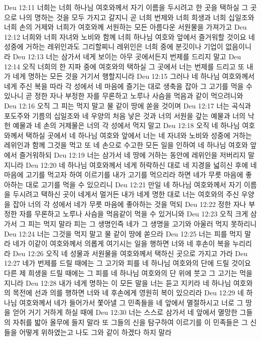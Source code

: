 Deu 12:11  너희는 너희 하나님 여호와께서 자기 이름을 두시려고 한 곳을 택하실 그 곳으로 나의 명하는 것을 모두 가지고 갈지니 곧 너희 번제와 너희 희생과 너희 십일조와 너희 손의 거제와 너희가 여호와께 서원하는 모든 아름다운 서원물을 가져가고
Deu 12:12  너희와 너희 자녀와 노비와 함께 너희 하나님 여호와 앞에서 즐거워할 것이요 네 성중에 거하는 레위인과도 그리할찌니 레위인은 너희 중에 분깃이나 기업이 없음이니라
Deu 12:13  너는 삼가서 네게 보이는 아무 곳에서든지 번제를 드리지 말고
Deu 12:14  오직 너희의 한 지파 중에 여호와의 택하실 그 곳에서 너는 번제를 드리고 또 내가 네게 명하는 모든 것을 거기서 행할지니라
Deu 12:15  그러나 네 하나님 여호와께서 네게 주신 복을 따라 각 성에서 네 마음에 즐기는 대로 생축을 잡아 그 고기를 먹을 수 있나니 곧 정한 자나 부정한 자를 무론하고 노루나 사슴을 먹음과 같이 먹으려니와
Deu 12:16  오직 그 피는 먹지 말고 물 같이 땅에 쏟을 것이며
Deu 12:17  너는 곡식과 포도주와 기름의 십일조와 네 우양의 처음 낳은 것과 너의 서원을 갚는 예물과 너의 낙헌 예물과 네 손의 거제물은 너의 각 성에서 먹지 말고
Deu 12:18  오직 네 하나님 여호와께서 택하실 곳에서 네 하나님 여호와 앞에서 너는 네 자녀와 노비와 성중에 거하는 레위인과 함께 그것을 먹고 또 네 손으로 수고한 모든 일을 인하여 네 하나님 여호와 앞에서 즐거워하되
Deu 12:19  너는 삼가서 네 땅에 거하는 동안에 레위인을 저버리지 말지니라
Deu 12:20  네 하나님 여호와께서 네게 허락하신 대로 네 지경을 넓히신 후에 네 마음에 고기를 먹고자 하여 이르기를 내가 고기를 먹으리라 하면 네가 무릇 마음에 좋아하는 대로 고기를 먹을 수 있으리니
Deu 12:21  만일 네 하나님 여호와께서 자기 이름을 두시려고 택하신 곳이 네게서 멀거든 내가 네게 명한 대로 너는 여호와의 주신 우양을 잡아 너의 각 성에서 네가 무릇 마음에 좋아하는 것을 먹되
Deu 12:22  정한 자나 부정한 자를 무론하고 노루나 사슴을 먹음같이 먹을 수 있거니와
Deu 12:23  오직 크게 삼가서 그 피는 먹지 말라 피는 그 생명인즉 네가 그 생명을 고기와 아울러 먹지 못하리니
Deu 12:24  너는 그것을 먹지 말고 물 같이 땅에 쏟으라
Deu 12:25  너는 피를 먹지 말라 네가 이같이 여호와께서 의롭게 여기시는 일을 행하면 너와 네 후손이 복을 누리리라
Deu 12:26  오직 네 성물과 서원물을 여호와께서 택하신 곳으로 가지고 가라
Deu 12:27  네가 번제를 드릴 때에는 그 고기와 피를 네 하나님 여호와의 단에 드릴 것이요 다른 제 희생을 드릴 때에는 그 피를 네 하나님 여호와의 단 위에 붓고 그 고기는 먹을지니라
Deu 12:28  내가 네게 명하는 이 모든 말을 너는 듣고 지키라 네 하나님 여호와의 목전에 선과 의를 행하면 너와 네 후손에게 영원히 복이 있으리라
Deu 12:29  네 하나님 여호와께서 네가 들어가서 쫓아낼 그 민족들을 네 앞에서 멸절하시고 너로 그 땅을 얻어 거기 거하게 하실 때에
Deu 12:30  너는 스스로 삼가서 네 앞에서 멸망한 그들의 자취를 밟아 올무에 들지 말라 또 그들의 신을 탐구하여 이르기를 이 민족들은 그 신들을 어떻게 위하였는고 나도 그와 같이 하겠다 하지 말라
